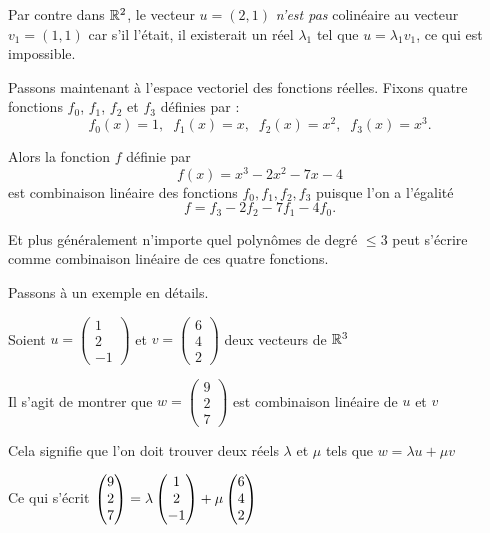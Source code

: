 Par contre dans $\mathbb{R}^2$, le vecteur
$u=(2,1)$ \emph{n'est pas} colinéaire au vecteur $v_1=(1,1)$
car s'il l'était, il existerait un réel $\lambda_1$ tel que $u=\lambda_1 v_1$, ce qui est impossible.

\change

Passons maintenant à l'espace vectoriel des fonctions réelles.
Fixons quatre fonctions $f_0$, $f_1$, $f_2$ et $f_3$
 définies par : 
 $$f_0(x)=1, \;\;f_1(x)=x,\;\; f_2(x)=x^2,\;\; f_3(x)=x^3.$$
 
\change

 Alors la fonction $f$ définie par 
 $$f(x)=x^3-2x ^2-7x-4$$
 est combinaison linéaire des fonctions $f_0, f_1, f_2, f_3$ puisque l'on a l'égalité 
 $$f=f_{3}-2f_2-7f_1-4f_0.$$ 
 
 Et plus généralement n'importe quel polynômes de degré $\le 3$ peut s'écrire 
 comme combinaison linéaire de ces quatre fonctions.
 

\diapo

Passons à un exemple en détails.

Soient $u = \left(\begin{smallmatrix}1\\ 2\\ -1\end{smallmatrix}\right)$ et $v =
   \left(\begin{smallmatrix}6\\4\\2\end{smallmatrix}\right)$ deux vecteurs de $\mathbb{R}^3$

   \change
   
  Il s'agit de montrer que $w =
   \left(\begin{smallmatrix}9\\ 2\\ 7\end{smallmatrix}\right)$ est combinaison linéaire de $u$ et $v$
   
   \change
   
   Cela signifie que l'on doit trouver deux réels $\lambda$ et $\mu$ tels que $w=\lambda u + \mu v$
  
  \change 
  
  Ce qui s'écrit $\left(\begin{matrix}9\\2\\7\end{matrix}\right) 
 =  \lambda \left(\begin{matrix}1\cr 2\cr -1\end{matrix}\right) + \mu \left(\begin{matrix}6\\4\\2\end{matrix}\right)$
 
